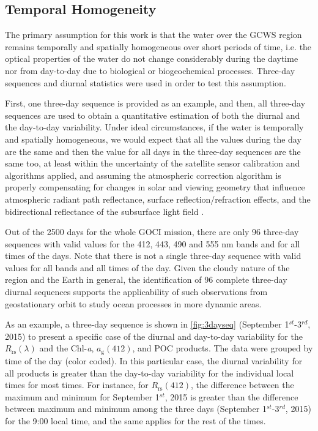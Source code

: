 \documentclass[remotesensing,article,submit,moreauthors,pdftex,10pt,a4paper]{Definitions/mdpi}
\begin{document}
\subsection{Temporal Homogeneity}
The primary assumption for this work is that the water over the GCWS region remains temporally and spatially homogeneous over short periods of time, i.e. the optical properties of the water do not change considerably during the daytime nor from day-to-day due to biological or biogeochemical processes. Three-day sequences and diurnal statistics were used in order to test this assumption. 

First, one three-day sequence is provided as an example, and then, all three-day sequences are used to obtain a quantitative estimation of both the diurnal and the day-to-day variability. Under ideal circumstances, if the water is temporally and spatially homogeneous, we would expect that all the values during the day are the same and then the value for all days in the three-day sequences are the same too, at least within the uncertainty of the satellite sensor calibration and algorithms applied, and assuming the atmospheric correction algorithm is properly compensating for changes in solar and viewing geometry that influence atmospheric radiant path reflectance, surface reflection/refraction effects, and the bidirectional reflectance of the subsurface light field \cite{Mobley2016}. 

Out of the 2500 days for the whole GOCI mission, there are only 96 three-day sequences with valid values for the 412, 443, 490 and 555 nm bands and for all times of the days. Note that there is not a single three-day sequence with valid values for all bands and all times of the day. Given the cloudy nature of the region and the Earth in general, the identification of 96 complete three-day diurnal sequences supports the applicability of such observations from geostationary orbit to study ocean processes in more dynamic areas. 

As an example, a three-day sequence is shown in \autoref{fig:3dayseq} (September 1$^{st}$-3$^{rd}$, 2015) to present a specific case of the diurnal and day-to-day variability for the $R_\text{rs}(\lambda)$ and the Chl-{\it a}, $a_\text{g}(412)$, and POC products. The data were grouped by time of the day (color coded). In this particular case, the diurnal variability for all products is greater than the day-to-day variability for the individual local times for most times. For instance, for $R_\text{rs}(412)$, the difference between the maximum and minimum for September 1$^{st}$, 2015 is greater than the difference between maximum and minimum among the three days (September 1$^{st}$-3$^{rd}$, 2015) for the 9:00 local time, and the same applies for the rest of the times. 
\end{document}
